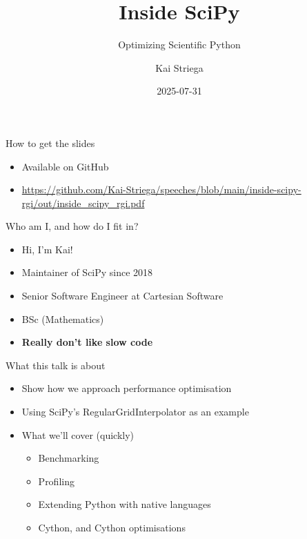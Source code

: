 \documentclass[12pt,xcolor=dvipsnames]{beamer}
\title{Inside SciPy}
\subtitle{Optimizing Scientific Python}
\date{2025-07-31}
\author{Kai Striega}
\institute{Cartesian Software \& SciPy}
\begin{document}
    \maketitle

    \begin{frame}{How to get the slides}
        \begin{itemize}
            \item Available on GitHub
            \item \url{https://github.com/Kai-Striega/speeches/blob/main/inside-scipy-rgi/out/inside_scipy_rgi.pdf}
        \end{itemize}
    \end{frame}

    \begin{frame}{Who am I, and how do I fit in?}
        \begin{itemize}
            \item Hi, I'm Kai!
            \item Maintainer of SciPy since 2018
            \item Senior Software Engineer at Cartesian Software
            \item BSc (Mathematics)
            \item \textbf{Really don't like slow code}
        \end{itemize}
    \end{frame}

    \begin{frame}{What this talk is about}
        \begin{itemize}
            \item Show how we approach performance optimisation
            \item Using SciPy’s RegularGridInterpolator as an example
            \item What we'll cover (quickly)
            \begin{itemize}
                \item Benchmarking
                \item Profiling
                \item Extending Python with native languages
                \item Cython, and Cython optimisations
            \end{itemize}
        \end{itemize}
    \end{frame}
\end{document}

